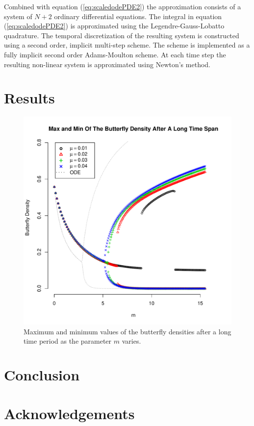 \documentclass[12pt]{article}
\begin{document}
Combined with equation (\ref{eq:scaledodePDE2}) the approximation
consists of a system of $N+2$ ordinary differential equations. The
integral in equation (\ref{eq:scaledodePDE2}) is approximated using
the Legendre-Gauss-Lobatto quadrature. The temporal discretization of
the resulting system is constructed using a second order, implicit
multi-step scheme. The scheme is implemented as a fully implicit
second order Adams-Moulton scheme\cite{ascher2011first}. At each time
step the resulting non-linear system is approximated using Newton's
method.

\section{Results}
\label{section:results}

\begin{figure}[htb]
  \centering
  \includegraphics[width=12cm]{maxMinByM-mu-01-04.pdf}
  \caption[Maximum and minimum values of the butterfly
  density]{Maximum and minimum values of the butterfly densities after
    a long time period as the parameter $m$ varies.}
  \label{fig:maxMinButterflySmallMu}
\end{figure}

\section{Conclusion}

\section{Acknowledgements}



\end{document}
